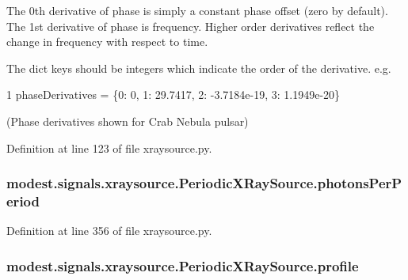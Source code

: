 The 0th derivative of phase is simply a constant phase offset (zero by default). The 1st derivative of phase is frequency. Higher order derivatives reflect the change in frequency with respect to time.

The dict keys should be integers which indicate the order of the derivative. e.\+g. 
\begin{DoxyCode}
1 phaseDerivatives = \{0: 0, 1: 29.7417, 2: -3.7184e-19, 3: 1.1949e-20\}
\end{DoxyCode}
 (Phase derivatives shown for Crab Nebula pulsar) 

Definition at line 123 of file xraysource.\+py.

\subsubsection[{\texorpdfstring{photons\+Per\+Period}{photonsPerPeriod}}]{\setlength{\rightskip}{0pt plus 5cm}modest.\+signals.\+xraysource.\+Periodic\+X\+Ray\+Source.\+photons\+Per\+Period}\hypertarget{classmodest_1_1signals_1_1xraysource_1_1PeriodicXRaySource_a25ab09a55afd1da4f019ad580770e5f4}{}\label{classmodest_1_1signals_1_1xraysource_1_1PeriodicXRaySource_a25ab09a55afd1da4f019ad580770e5f4}


Definition at line 356 of file xraysource.\+py.

\subsubsection[{\texorpdfstring{profile}{profile}}]{\setlength{\rightskip}{0pt plus 5cm}modest.\+signals.\+xraysource.\+Periodic\+X\+Ray\+Source.\+profile}\hypertarget{classmodest_1_1signals_1_1xraysource_1_1PeriodicXRaySource_a50e061bb97d0dd6ab7f344370c6b35a4}{}\label{classmodest_1_1signals_1_1xraysource_1_1PeriodicXRaySource_a50e061bb97d0dd6ab7f344370c6b35a4}


